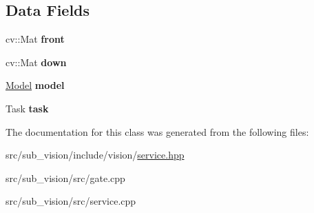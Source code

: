 \subsection*{Data Fields}
\begin{DoxyCompactItemize}
\item 
\mbox{\label{classVisionService_aab2728718c9697f322dc84914a670484}} 
cv\+::\+Mat {\bfseries front}
\item 
\mbox{\label{classVisionService_aea4889f5af8acdf4b6e222f67c58477b}} 
cv\+::\+Mat {\bfseries down}
\item 
\mbox{\label{classVisionService_aa0b7cb339423b293d576e69759a754bc}} 
\hyperlink{classModel}{Model} {\bfseries model}
\item 
\mbox{\label{classVisionService_a6089969c6dc3a41dc384b4963f6bd37a}} 
Task {\bfseries task}
\end{DoxyCompactItemize}


The documentation for this class was generated from the following files\+:\begin{DoxyCompactItemize}
\item 
src/sub\+\_\+vision/include/vision/\hyperlink{sub__vision_2include_2vision_2service_8hpp}{service.\+hpp}\item 
src/sub\+\_\+vision/src/gate.\+cpp\item 
src/sub\+\_\+vision/src/service.\+cpp\end{DoxyCompactItemize}
